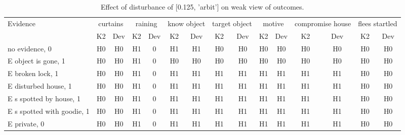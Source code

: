 \begin{table}\begin{tabular}{l|cc|cc|cc|cc|cc|cc|cc}\toprule\multirow{2}{*}{Evidence} & \multicolumn{2}{c}{curtains}& \multicolumn{2}{c}{raining}& \multicolumn{2}{c}{know object}& \multicolumn{2}{c}{target object}& \multicolumn{2}{c}{motive}& \multicolumn{2}{c}{compromise house}& \multicolumn{2}{c}{flees startled}\\& {K2} & {Dev}& {K2} & {Dev}& {K2} & {Dev}& {K2} & {Dev}& {K2} & {Dev}& {K2} & {Dev}& {K2} & {Dev}\\\midrule
no evidence, 0 & H0&H0&\cellcolor{Bittersweet}H1&\cellcolor{Bittersweet}0&H1&H1&H0&H0&H0&H0&H0&H0&H0&H0\\E object is gone, 1 & H0&H0&\cellcolor{Bittersweet}H1&\cellcolor{Bittersweet}0&H0&H0&H0&H0&H0&H0&H0&H0&H0&H0\\E broken lock, 1 & H0&H0&\cellcolor{Bittersweet}H1&\cellcolor{Bittersweet}0&H1&H1&H1&H1&H1&H1&H1&H1&H0&H0\\E disturbed house, 1 & H0&H0&\cellcolor{Bittersweet}H1&\cellcolor{Bittersweet}0&H1&H1&H1&H1&H1&H1&H1&H1&H0&H0\\E s spotted by house, 1 & H0&H0&\cellcolor{Bittersweet}H1&\cellcolor{Bittersweet}0&H1&H1&H1&H1&H1&H1&H1&H1&H0&H0\\E s spotted with goodie, 1 & H0&H0&\cellcolor{Bittersweet}H1&\cellcolor{Bittersweet}0&H1&H1&H1&H1&H1&H1&H1&H1&H0&H0\\E private, 0 & H0&H0&\cellcolor{Bittersweet}H1&\cellcolor{Bittersweet}0&H1&H1&H1&H1&H1&H1&H1&H1&H0&H0\\\bottomrule\end{tabular}\caption{Effect of disturbance of [0.125, 'arbit'] on weak view of outcomes.}\end{table}